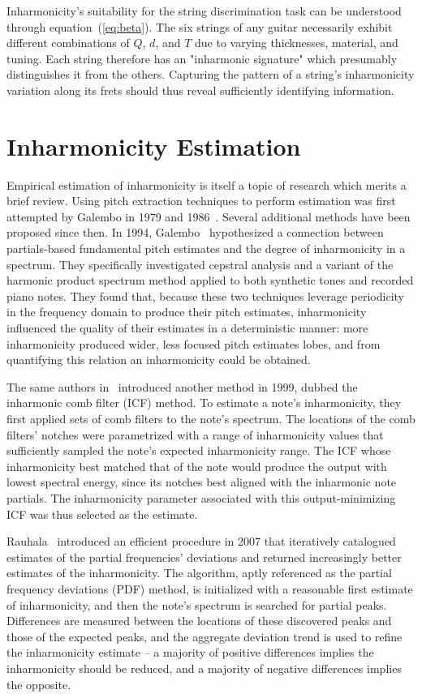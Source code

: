 \documentclass[12pt]{cmuthesis}
\begin{document}
Inharmonicity's suitability for the string discrimination task can be understood through equation~(\ref{eq:beta}). The six strings of any guitar necessarily exhibit different combinations of $Q$, $d$, and $T$ due to varying thicknesses, material, and tuning. Each string therefore has an "inharmonic signature" which presumably distinguishes it from the others. Capturing the pattern of a string's inharmonicity variation along its frets should thus reveal sufficiently identifying information.

\section{Inharmonicity Estimation}
\label{lit-beta-est}
Empirical estimation of inharmonicity is itself a topic of research which merits a brief review. Using pitch extraction techniques to perform estimation was first attempted by Galembo in 1979 and 1986~\cite{galembo1979,galembo1987}. Several additional methods have been proposed since then. In 1994, Galembo~\cite{galembo1994} hypothesized a connection between partials-based fundamental pitch estimates and the degree of inharmonicity in a spectrum. They specifically investigated cepstral analysis and a variant of the harmonic product spectrum method applied to both synthetic tones and recorded piano notes. They found that, because these two techniques leverage periodicity in the frequency domain to produce their pitch estimates, inharmonicity influenced the quality of their estimates in a deterministic manner: more inharmonicity produced wider, less focused pitch estimates lobes, and from quantifying this relation an inharmonicity could be obtained.
 
 The same authors in~\cite{galembo1999} introduced another method in 1999, dubbed the inharmonic comb filter (ICF) method. To estimate a note's inharmonicity, they first applied sets of comb filters to the note's spectrum. The locations of the comb filters' notches were parametrized with a range of inharmonicity values that sufficiently sampled the note's expected inharmonicity range. The ICF whose inharmonicity best matched that of the note would produce the output with lowest spectral energy, since its notches best aligned with the inharmonic note partials. The inharmonicity parameter associated with this output-minimizing ICF was thus selected as the estimate.
 
Rauhala~\cite{rauhala2007} introduced an efficient procedure in 2007 that iteratively catalogued estimates of the partial frequencies' deviations and returned increasingly better estimates of the inharmonicity. The algorithm, aptly referenced as the partial frequency deviations (PDF) method, is initialized with a reasonable first estimate of inharmonicity, and then the note's spectrum is searched for partial peaks. Differences are measured between the locations of these discovered peaks and those of the expected peaks, and the aggregate deviation trend is used to refine the inharmonicity estimate -- a majority of positive differences implies the inharmonicity should be reduced, and a majority of negative differences implies the opposite.
\end{document}
